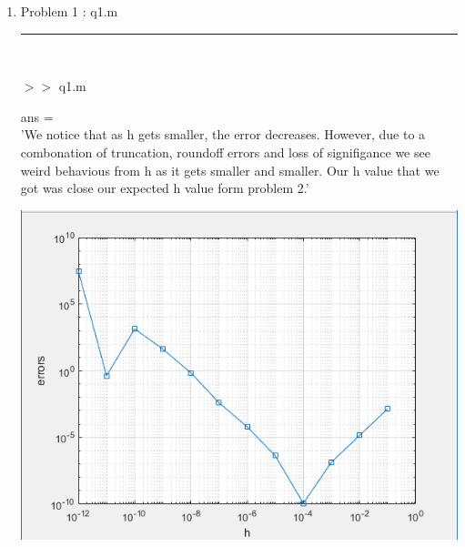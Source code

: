 \documentclass[12pt]{article}
\begin{document}
	\begin{enumerate}
	
	\item[] Problem 1 : q1.m \noindent\rule{\textwidth}{1.0pt} \\
		
	
	\pagebreak	
	
	$>>$ q1.m
	\begin{framed}
		ans =\\

    'We notice that as h gets smaller, the error decreases. However, due to a combonation of truncation, roundoff errors and loss of signifigance we see weird behavious from h as it gets smaller and smaller. Our h value that we got was close our expected h value form problem 2.'

	\end{framed}
	
	\begin{center}
		\includegraphics[scale=0.95]{graph1}
	\end{center} 
	
	\end{enumerate}
	\pagebreak	
	
\end{document}
